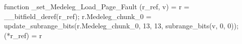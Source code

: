 function _set_Medeleg_Load_Page_Fault (r_ref, v) = {
    r = __bitfield_deref(r_ref);
    r.Medeleg_chunk_0 = update_subrange_bits(r.Medeleg_chunk_0, 13, 13, subrange_bits(v, 0, 0));
    (*r_ref) = r
}
